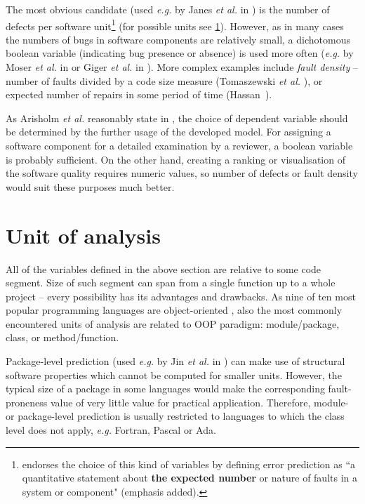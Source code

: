 \documentclass{pracamgr}
\begin{document}
The most obvious candidate (used \textit{e.g.} by Janes \textit{et al.} in \cite{Janes}) is the number of defects per software unit\footnote{\cite[p. 31]{glossary} endorses the choice of this kind of variables by defining error prediction as ``a quantitative statement about \textbf{the expected number} or nature of faults in a system or component" (emphasis added).} (for possible units see \ref{sec:unit_of_analysis}). However, as in many cases the numbers of bugs in software components are relatively small, a dichotomous boolean variable (indicating bug presence or absence) is used more often (\textit{e.g.} by Moser \textit{et al.} in \cite{comparative} or Giger \textit{et al.} in \cite{method-level}). More complex examples include \emph{fault density} -- number of faults divided by a code size measure (Tomaszewski \textit{et al.} \cite{Tomaszewski}), or expected number of repairs in some period of time (Hassan~\cite{complexity}).

As Arisholm \textit{et al.} reasonably state in \cite[p. 5]{systematic}, the choice of dependent variable should be determined by the further usage of the developed model. For assigning a software component for a detailed examination by a reviewer, a boolean variable is probably sufficient. On the other hand, creating a ranking or visualisation of the software quality requires numeric values, so number of defects or fault density would suit these purposes much better.

\section{Unit of analysis}
\label{sec:unit_of_analysis}
All of the variables defined in the above section are relative to some code segment. Size of such segment can span from a single function up to a whole project -- every possibility has its advantages and drawbacks. As nine of ten most popular programming languages are object-oriented \cite{popularity1,popularity2}, also the most commonly encountered units of analysis are related to OOP paradigm: module/package, class, or method/function.

Package-level prediction (used \textit{e.g.} by Jin \textit{et al.} in \cite{Jin}) can make use of structural software properties which cannot be computed for smaller units. However, the typical size of a package in some languages would make the corresponding fault-proneness value of very little value for practical application. Therefore, module- or package-level prediction is usually restricted to languages to which the class level does not apply, \textit{e.g.} Fortran, Pascal or Ada.
\end{document}
